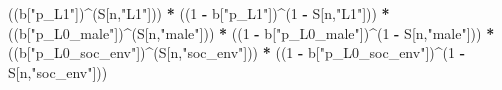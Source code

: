 \documentclass[
]{book}
\newenvironment{Shaded}{\begin{snugshade}}{\end{snugshade}}
\newcommand{\DecValTok}[1]{\textcolor[rgb]{0.00,0.00,0.81}{#1}}
\newcommand{\NormalTok}[1]{#1}
\newcommand{\SpecialCharTok}[1]{\textcolor[rgb]{0.81,0.36,0.00}{\textbf{#1}}}
\newcommand{\StringTok}[1]{\textcolor[rgb]{0.31,0.60,0.02}{#1}}
\begin{document}
\begin{Shaded}
\begin{Highlighting}[]
\NormalTok{      ((b[}\StringTok{"p\_L1"}\NormalTok{])}\SpecialCharTok{\^{}}\NormalTok{(S[n,}\StringTok{"L1"}\NormalTok{])) }\SpecialCharTok{*}
\NormalTok{      ((}\DecValTok{1} \SpecialCharTok{{-}}\NormalTok{ b[}\StringTok{"p\_L1"}\NormalTok{])}\SpecialCharTok{\^{}}\NormalTok{(}\DecValTok{1} \SpecialCharTok{{-}}\NormalTok{ S[n,}\StringTok{"L1"}\NormalTok{])) }\SpecialCharTok{*}
\NormalTok{      ((b[}\StringTok{"p\_L0\_male"}\NormalTok{])}\SpecialCharTok{\^{}}\NormalTok{(S[n,}\StringTok{"male"}\NormalTok{])) }\SpecialCharTok{*} 
\NormalTok{      ((}\DecValTok{1} \SpecialCharTok{{-}}\NormalTok{ b[}\StringTok{"p\_L0\_male"}\NormalTok{])}\SpecialCharTok{\^{}}\NormalTok{(}\DecValTok{1} \SpecialCharTok{{-}}\NormalTok{ S[n,}\StringTok{"male"}\NormalTok{])) }\SpecialCharTok{*} 
\NormalTok{      ((b[}\StringTok{"p\_L0\_soc\_env"}\NormalTok{])}\SpecialCharTok{\^{}}\NormalTok{(S[n,}\StringTok{"soc\_env"}\NormalTok{])) }\SpecialCharTok{*}
\NormalTok{      ((}\DecValTok{1} \SpecialCharTok{{-}}\NormalTok{ b[}\StringTok{"p\_L0\_soc\_env"}\NormalTok{])}\SpecialCharTok{\^{}}\NormalTok{(}\DecValTok{1} \SpecialCharTok{{-}}\NormalTok{ S[n,}\StringTok{"soc\_env"}\NormalTok{])) }
    

\end{Highlighting}
\end{Shaded}
\end{document}

